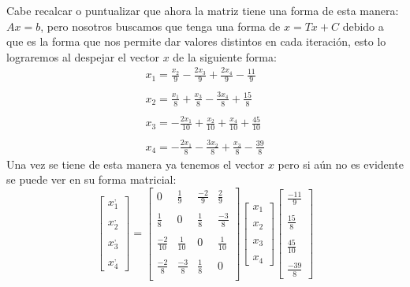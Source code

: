 \documentclass{article}
\begin{document}
Cabe recalcar o puntualizar que ahora la matriz tiene una forma de esta manera: $Ax = b$,
pero nosotros buscamos que tenga una forma de $x = Tx + C$ debido a que es la forma que nos
permite dar valores distintos en cada iteración, esto lo lograremos al despejar el vector $x$
de la siguiente forma:
\begin{equation*}
   \begin{matrix}
       x_1 = \frac{x_2}{9} - \frac{2x_3}{9} +\frac{2x_4}{9} - \frac{11}{9}\\
       \\
       x_2 = \frac{x_1}{8} + \frac{x_3}{8} - \frac{3x_4}{8} + \frac{15}{8}\\
       \\
       x_3 = -\frac{2x_1}{10} + \frac{x_2}{10} + \frac{x_4}{10} + \frac{45}{10}\\
       \\
       x_4 = - \frac{2x_1}{8} - \frac{3x_2}{8} + \frac{x_3}{8} - \frac{39}{8}
   \end{matrix}
\end{equation*}
Una vez se tiene de esta manera ya tenemos el vector $x$ pero si aún no es evidente se puede ver
en su forma matricial:
\begin{equation*}
   \begin{bmatrix}
       x^{,}_1 \\
       \\
       x^{,}_2 \\
       \\
       x^{,}_3 \\
       \\
       x^{,}_4
   \end{bmatrix}
   =
   \begin{bmatrix}
       0 & \frac{1}{9} & \frac{-2}{9} & \frac{2}{9} \\
       \\
       \frac{1}{8} & 0 & \frac{1}{8} & \frac{-3}{8} \\
       \\
       \frac{-2}{10} & \frac{1}{10} & 0 & \frac{1}{10} \\
       \\
       \frac{-2}{8} & \frac{-3}{8} & \frac{1}{8} & 0 \\
   \end{bmatrix}
   \begin{bmatrix}
       x_1 \\
       \\
       x_2 \\
       \\
       x_3 \\
       \\
       x_4
   \end{bmatrix}
   \begin{bmatrix}
       \frac{-11}{9} \\
       \\
       \frac{15}{8} \\
       \\
       \frac{45}{10} \\
       \\
       \frac{-39}{8}
   \end{bmatrix}
\end{equation*}
\end{document}
